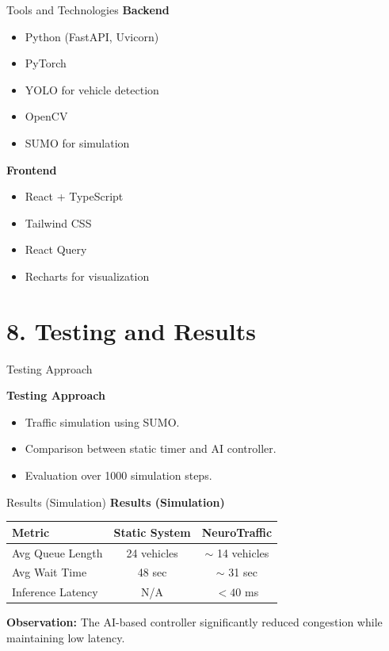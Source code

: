 \documentclass[aspectratio=169]{beamer}
\begin{document}
\begin{frame}{Tools and Technologies}
\textbf{Backend}
\begin{itemize}
    \item Python (FastAPI, Uvicorn)
    \item PyTorch
    \item YOLO for vehicle detection
    \item OpenCV
    \item SUMO for simulation
\end{itemize}

\textbf{Frontend}
\begin{itemize}
    \item React + TypeScript
    \item Tailwind CSS
    \item React Query
    \item Recharts for visualization
\end{itemize}
\end{frame}

\section{8. Testing and Results}

\begin{frame}{Testing Approach}

\textbf{Testing Approach}
\begin{itemize}
    \item Traffic simulation using SUMO.
    \item Comparison between static timer and AI controller.
    \item Evaluation over 1000 simulation steps.
\end{itemize}
\end{frame}

\begin{frame}{Results (Simulation)}
\textbf{Results (Simulation)}

\begin{table}
\centering
\begin{tabular}{|l|c|c|}
\hline
Metric & Static System & NeuroTraffic \\ \hline
Avg Queue Length & 24 vehicles & $\sim$ 14 vehicles \\ \hline
Avg Wait Time & 48 sec & $\sim$ 31 sec \\ \hline
Inference Latency & N/A & $< 40$ ms \\ \hline
\end{tabular}
\end{table}

\vspace{0.2cm}

\textbf{Observation:} The AI-based controller significantly reduced congestion while maintaining low latency.
\end{frame}
\end{document}

